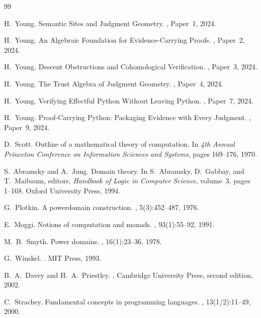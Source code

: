 \documentclass[11pt]{article}
\begin{document}
\begin{thebibliography}{99}

H.~Young.
\newblock Semantic Sites and Judgment Geometry.
, Paper~1, 2024.

H.~Young.
\newblock An Algebraic Foundation for Evidence-Carrying Proofs.
, Paper~2, 2024.

H.~Young.
\newblock Descent Obstructions and Cohomological Verification.
, Paper~3, 2024.

H.~Young.
\newblock The Trust Algebra of Judgment Geometry.
, Paper~4, 2024.

H.~Young.
\newblock Verifying Effectful Python Without Leaving Python.
, Paper~7, 2024.

H.~Young.
\newblock Proof-Carrying Python: Packaging Evidence with Every Judgment.
, Paper~9, 2024.

D.~Scott.
\newblock Outline of a mathematical theory of computation.
\newblock In {\em 4th Annual Princeton Conference on Information Sciences
  and Systems}, pages 169--176, 1970.

S.~Abramsky and A.~Jung.
\newblock Domain theory.
\newblock In S.~Abramsky, D.~Gabbay, and T.~Maibaum, editors,
  {\em Handbook of Logic in Computer Science}, volume~3,
  pages 1--168. Oxford University Press, 1994.

G.~Plotkin.
\newblock A powerdomain construction.
, 5(3):452--487, 1976.

E.~Moggi.
\newblock Notions of computation and monads.
, 93(1):55--92, 1991.

M.~B.~Smyth.
\newblock Power domains.
, 16(1):23--36, 1978.

G.~Winskel.
.
\newblock MIT Press, 1993.

B.~A.~Davey and H.~A.~Priestley.
.
\newblock Cambridge University Press, second edition, 2002.

C.~Strachey.
\newblock Fundamental concepts in programming languages.
, 13(1/2):11--49, 2000.

\end{thebibliography}
\end{document}
